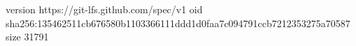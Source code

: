 version https://git-lfs.github.com/spec/v1
oid sha256:135462511cb676580b1103366111ddd1d0faa7c094791ccb7212353275a70587
size 31791
